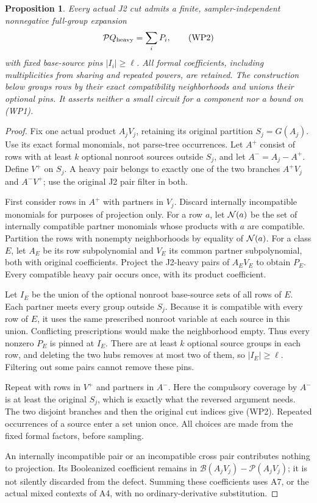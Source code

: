 \documentclass[11pt]{article}
\newtheorem{proposition}{Proposition}
\newcommand{\Pp}{\mathcal P}
\newcommand{\B}{\mathcal B}
\begin{document}
\begin{proposition}
Every actual J2 cut admits a finite, sampler-independent nonnegative
full-group expansion
\[
                    \Pp Q_{\rm heavy}=\sum_iP_i,       \tag{WP2}
\]
with fixed base-source pins $|I_i|\ge\ell$.
All formal coefficients, including multiplicities from sharing and
repeated powers, are retained. The construction below groups rows by
their exact compatibility neighborhoods and unions their optional pins.
It asserts neither a small circuit for a component nor a bound on (WP1).
\end{proposition}
\begin{proof}
Fix one actual product $A_jV_j$, retaining its original partition
$S_j=G(A_j)$. Use its exact formal monomials, not parse-tree occurrences.
Let $A^+$ consist of rows with at least $k$ optional nonroot sources
outside $S_j$, and let $A^-=A_j-A^+$. Define $V^+$ on $S_j$.
A heavy pair belongs to exactly one of the two branches
$A^+V_j$ and $A^-V^+$; use the original J2 pair filter in both.

First consider rows in $A^+$ with partners in $V_j$.
Discard internally incompatible monomials for purposes of projection
only. For a row $a$, let ${\cal N}(a)$ be the set of internally
compatible partner monomials whose products with $a$ are compatible.
Partition the rows with nonempty neighborhoods by equality of
${\cal N}(a)$. For a class $E$, let $A_E$ be its row subpolynomial
and $V_E$ its common partner subpolynomial, both with original
coefficients. Project the J2-heavy pairs of $A_EV_E$ to obtain $P_E$.
Every compatible heavy pair occurs once, with its product coefficient.

Let $I_E$ be the union of the optional nonroot base-source sets
of all rows of $E$. Each partner meets every group outside $S_j$.
Because it is compatible with every row of $E$, it uses the same
prescribed nonroot variable at each source in this union.
Conflicting prescriptions would make the neighborhood empty.
Thus every nonzero $P_E$ is pinned at $I_E$.
There are at least $k$ optional source groups in each row, and deleting
the two hubs removes at most two of them, so $|I_E|\ge\ell$.
Filtering out some pairs cannot remove these pins.

Repeat with rows in $V^+$ and partners in $A^-$.
Here the compulsory coverage by $A^-$ is at least the original $S_j$,
which is exactly what the reversed argument needs.
The two disjoint branches and then the original cut indices give (WP2).
Repeated occurrences of a source enter a set union once.
All choices are made from the fixed formal factors, before sampling.

An internally incompatible pair or an incompatible cross pair
contributes nothing to projection. Its Booleanized coefficient remains
in $\B(A_jV_j)-\Pp(A_jV_j)$; it is not silently discarded from the
defect. Summing these coefficients uses A7, or the actual mixed
contexts of A4, with no ordinary-derivative substitution.
\end{proof}
\end{document}
